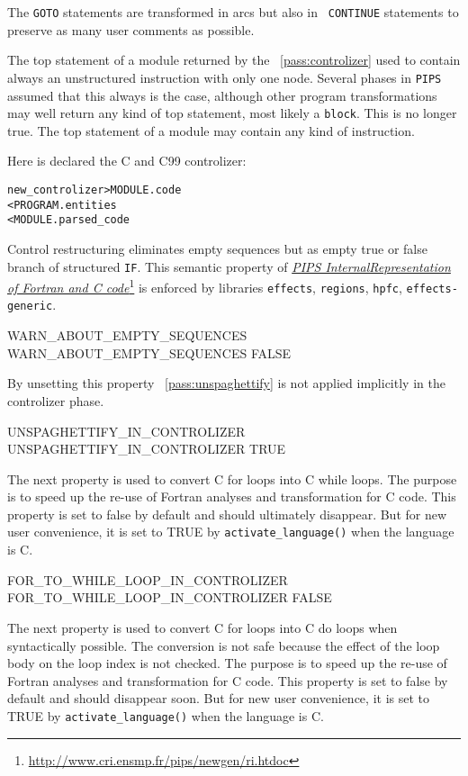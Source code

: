 \documentclass[a4paper]{report}
\newenvironment{PipsMake}{\begin{alltt}}{\end{alltt}}
\newcommand{\PipsPassRef}[1]{\texttt{\detokenize{#1}}~\ref{pass:#1}}
\newcommand{\LINK}[2]{\href{#2}{#1}\footnote{\url{#2}}\xspace}
\newcommand{\Pips}{\texttt{PIPS}}
\newcommand{\Pri}{\LINK{\emph{PIPS Internal\space{}Representation of
      Fortran and C code}}{http://www.cri.ensmp.fr/pips/newgen/ri.htdoc}}
\begin{document}
The {\tt GOTO} statements are transformed in arcs but also in {\tt
CONTINUE} statements to preserve as many user comments as possible.

The top statement of a module returned by the \PipsPassRef{controlizer} used to
contain always an unstructured instruction with only one node. Several phases
in \Pips{} assumed that this always is the case, although other program
transformations may well return any kind of top statement, most likely a
\texttt{block}. This is no longer true. The top statement of a module may
contain any kind of instruction.

Here is declared the C and C99 controlizer:

\begin{PipsMake}
new_controlizer                     > MODULE.code
        < PROGRAM.entities
        < MODULE.parsed_code
\end{PipsMake}

Control restructuring eliminates empty sequences but as empty true or
false branch of structured \verb/IF/. This semantic property of \Pri{}
is enforced by libraries \verb/effects/,
\verb/regions/, \verb/hpfc/, \verb/effects-generic/.

\begin{PipsProp}{WARN_ABOUT_EMPTY_SEQUENCES}
WARN_ABOUT_EMPTY_SEQUENCES FALSE
\end{PipsProp}


By unsetting this property \PipsPassRef{unspaghettify} is not applied
implicitly in the controlizer phase.

\begin{PipsProp}{UNSPAGHETTIFY_IN_CONTROLIZER}
UNSPAGHETTIFY_IN_CONTROLIZER TRUE
\end{PipsProp}

The next property is used to convert C for loops into C while
loops. The purpose is to speed up the re-use of Fortran analyses and
transformation for C code. This property is set to false by default
and should ultimately disappear. But for new user convenience, it is
set to TRUE by \verb/activate_language()/ when the language is C.

\begin{PipsProp}{FOR_TO_WHILE_LOOP_IN_CONTROLIZER}
FOR_TO_WHILE_LOOP_IN_CONTROLIZER FALSE
\end{PipsProp}

The next property is used to convert C for loops into C do loops when
syntactically possible. The conversion is not safe because the effect of
the loop body on the loop index is not checked. The purpose is to speed up
the re-use of Fortran analyses and transformation for C code. This
property is set to false by default and should disappear soon. But for
new user convenience, it is set to TRUE by \verb/activate_language()/
when the language is C.
\end{document}
